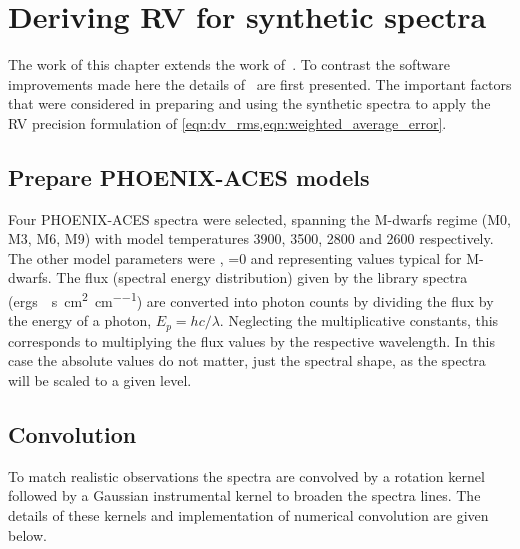 
\section{Deriving {RV} for synthetic spectra}
The work of this chapter extends the work of~\citep{figueira_radial_2016}.
To contrast the software improvements made here the details of~\citep{figueira_radial_2016} are first presented.
The important factors that were considered in preparing and using the synthetic spectra to apply the {RV} precision formulation of \cref{eqn:dv_rms,eqn:weighted_average_error}.

\subsection{Prepare {PHOENIX-ACES} models}
Four {PHOENIX-ACES} spectra were selected, spanning the M-dwarfs regime (M0, {M3}, {M6}, {M9}) with model temperatures 3900, 3500, 2800 and 2600\K{} respectively.
The other model parameters were , \feh{}=0 and  representing values typical for M-dwarfs.
The flux (spectral energy distribution) given by the library spectra (\si{{ergs} \per\second\per\centi\meter\squared\per\centi\metre}) are converted into photon counts by dividing the flux by the energy of a photon, \({E}_{p}=hc/\lambda\).
Neglecting the multiplicative constants, this corresponds to multiplying the flux values by the respective wavelength.
In this case the absolute values do not matter, just the spectral shape, as the spectra will be scaled to a given \snr{} level.

\subsection{Convolution}
\label{subsec:convolutions}
To match realistic observations the spectra are convolved by a rotation kernel followed by a Gaussian instrumental kernel to broaden the spectra lines.
The details of these kernels and implementation of numerical convolution are given below.

